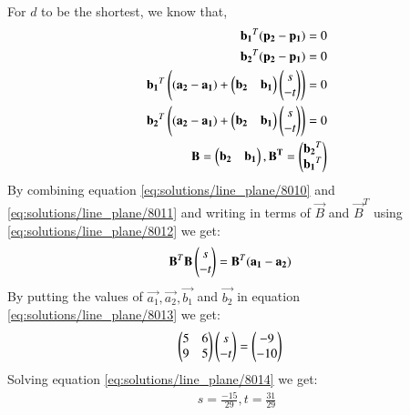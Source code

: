 For $d$ to be the shortest, we know that,
\begin{align}
\mathbf{b_1}^T(\mathbf{p_2}-\mathbf{p_1})=0\\
\mathbf{b_2}^T(\mathbf{p_2}-\mathbf{p_1})=0\\
\mathbf{b_1}^T\left((\mathbf{a_2}-\mathbf{a_1})+\begin{pmatrix}\mathbf{b_2}&\mathbf{b_1}\end{pmatrix}\begin{pmatrix}s\\-t\end{pmatrix}\right)=0\label{eq:solutions/line_plane/8010}\\
\mathbf{b_2}^T\left((\mathbf{a_2}-\mathbf{a_1})+\begin{pmatrix}\mathbf{b_2}&\mathbf{b_1}\end{pmatrix}\begin{pmatrix}s\\-t\end{pmatrix}\right)=0\label{eq:solutions/line_plane/8011}\\
\mathbf{B}= \begin{pmatrix}\mathbf{b_2}&\mathbf{b_1}\end{pmatrix}, \mathbf{B^T}= \begin{pmatrix}\mathbf{b_2}^T\\\mathbf{b_1}^T\end{pmatrix}\label{eq:solutions/line_plane/8012}
\end{align}
By combining equation \eqref{eq:solutions/line_plane/8010} and \eqref{eq:solutions/line_plane/8011} and writing in terms of $\vec{B}$ and $\vec{B}^T$ using \eqref{eq:solutions/line_plane/8012} we get:
\begin{align}
\mathbf{B}^T\mathbf{B}\begin{pmatrix}s\\-t\end{pmatrix}&=\mathbf{B}^T(\mathbf{a_1}-\mathbf{a_2})\label{eq:solutions/line_plane/8013}
\end{align}
By putting the values of $\vec{a_1}, \vec{a_2}, \vec{b_1}$ and $\vec{b_2}$ in equation \eqref{eq:solutions/line_plane/8013} we get:
\begin{align}
\begin{pmatrix}5&6\\9&5\end{pmatrix}\begin{pmatrix}s\\-t\end{pmatrix}&=\begin{pmatrix}-9\\-10\end{pmatrix}\label{eq:solutions/line_plane/8014}
\end{align}
Solving equation \eqref{eq:solutions/line_plane/8014} we get:
\begin{align}
    s=\frac{-15}{29}, t=\frac{31}{29}
\end{align}


